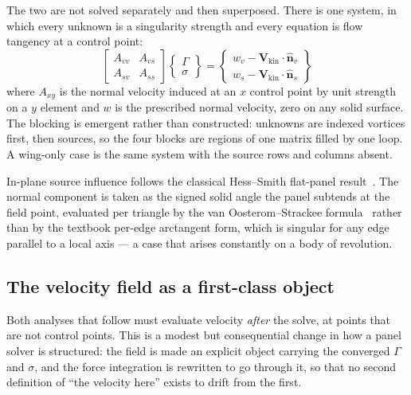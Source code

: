 \documentclass[submit]{aiaa-tc}%
\begin{document}
The two are not solved separately and then superposed. There is one
system, in which every unknown is a singularity strength and every
equation is flow tangency at a control point:
%
\begin{equation}
  \label{eq:blocked}
  \begin{bmatrix} A_{vv} & A_{vs} \\ A_{sv} & A_{ss} \end{bmatrix}
  \begin{Bmatrix} \Gamma \\ \sigma \end{Bmatrix}
  =
  \begin{Bmatrix} w_v - \mathbf{V}_{\text{kin}}\cdot\hat{\mathbf{n}}_v \\
                  w_s - \mathbf{V}_{\text{kin}}\cdot\hat{\mathbf{n}}_s \end{Bmatrix}
\end{equation}
%
where $A_{xy}$ is the normal velocity induced at an $x$ control point by
unit strength on a $y$ element and $w$ is the prescribed normal velocity,
zero on any solid surface. The blocking is emergent rather than
constructed: unknowns are indexed vortices first, then sources, so the
four blocks are regions of one matrix filled by one loop. A wing-only case
is the same system with the source rows and columns absent.

In-plane source influence follows the classical Hess--Smith flat-panel
result~\cite{hessSmith1962,katzPlotkin2001}. The normal component is taken
as the signed solid angle the panel subtends at the field point, evaluated
per triangle by the van Oosterom--Strackee
formula~\cite{vanOosteromStrackee1983} rather than by the textbook
per-edge arctangent form, which is singular for any edge parallel to a
local axis --- a case that arises constantly on a body of revolution.

\subsection{The velocity field as a first-class object}
\label{sec:flowfield}

Both analyses that follow must evaluate velocity \emph{after} the solve,
at points that are not control points. This is a modest but consequential
change in how a panel solver is structured: the field is made an explicit
object carrying the converged $\Gamma$ and $\sigma$, and the force
integration is rewritten to go through it, so that no second definition of
``the velocity here'' exists to drift from the first.
\end{document}
